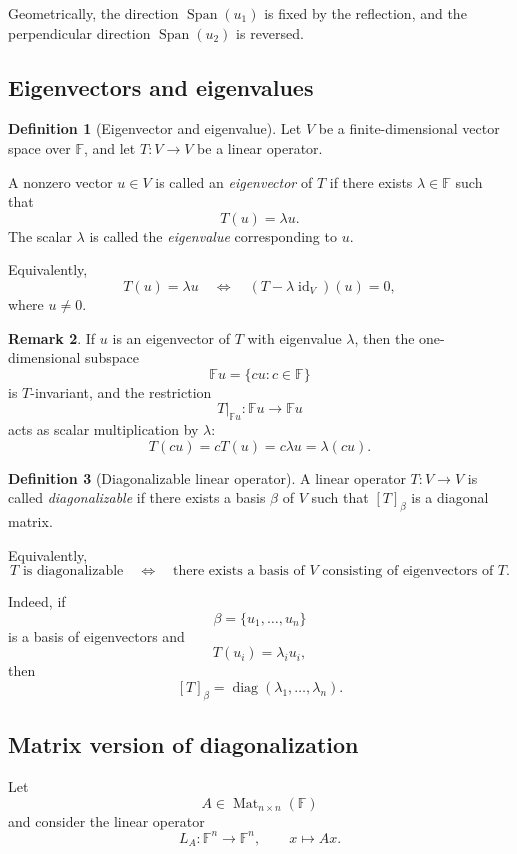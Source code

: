 \documentclass[11pt]{article}
\newcommand{\F}{\mathbb F}
\newcommand{\Mat}{\operatorname{Mat}}
\newcommand{\id}{\operatorname{id}}
\newcommand{\Span}{\operatorname{Span}}
\newcommand{\diag}{\operatorname{diag}}
\theoremstyle{definition}
\newtheorem{definition}{Definition}[section]
\newtheorem{remark}[definition]{Remark}
\theoremstyle{plain}
\begin{document}
Geometrically, the direction $\Span(u_1)$ is fixed by the reflection, and the perpendicular direction $\Span(u_2)$ is reversed.

\subsection{Eigenvectors and eigenvalues}

\begin{definition}[Eigenvector and eigenvalue]
Let $V$ be a finite-dimensional vector space over $\F$, and let $T:V\to V$ be a linear operator.

A nonzero vector $u\in V$ is called an \emph{eigenvector} of $T$ if there exists $\lambda\in\F$ such that
\[
T(u)=\lambda u.
\]
The scalar $\lambda$ is called the \emph{eigenvalue} corresponding to $u$.
\end{definition}

Equivalently,
\[
T(u)=\lambda u
\quad\Longleftrightarrow\quad
(T-\lambda\id_V)(u)=0,
\]
where $u\neq 0$.

\begin{remark}
If $u$ is an eigenvector of $T$ with eigenvalue $\lambda$, then the one-dimensional subspace
\[
\F u=\{cu:c\in\F\}
\]
is $T$-invariant, and the restriction
\[
T|_{\F u}:\F u\to\F u
\]
acts as scalar multiplication by $\lambda$:
\[
T(cu)=cT(u)=c\lambda u=\lambda(cu).
\]
\end{remark}

\begin{definition}[Diagonalizable linear operator]
A linear operator $T:V\to V$ is called \emph{diagonalizable} if there exists a basis $\beta$ of $V$ such that $[T]_{\beta}$ is a diagonal matrix.
\end{definition}

Equivalently,
\[
T\text{ is diagonalizable}
\quad\Longleftrightarrow\quad
\text{there exists a basis of }V\text{ consisting of eigenvectors of }T.
\]

Indeed, if
\[
\beta=\{u_1,\dots,u_n\}
\]
is a basis of eigenvectors and
\[
T(u_i)=\lambda_i u_i,
\]
then
\[
[T]_{\beta}=\diag(\lambda_1,\dots,\lambda_n).
\]

\subsection{Matrix version of diagonalization}

Let
\[
A\in \Mat_{n\times n}(\F)
\]
and consider the linear operator
\[
L_A:\F^n\to\F^n,
\qquad
x\mapsto Ax.
\]
\end{document}
